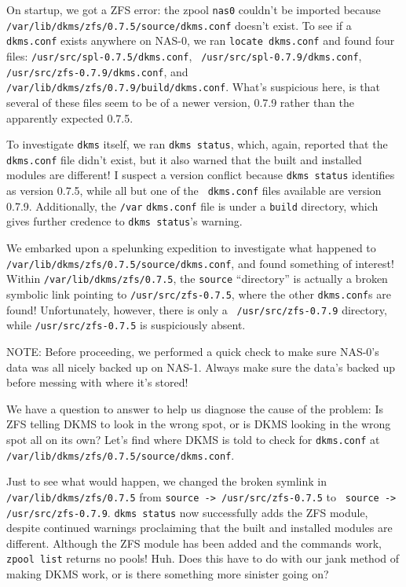 \documentclass[12pt]{article}
\begin{document}
\qq On startup, we got a ZFS error: the zpool {\tt nas0} couldn't be imported
because {\tt /var/lib/dkms/zfs/0.7.5/source/dkms.conf} doesn't exist. To see if
a {\tt dkms.conf} exists anywhere on NAS-0, we ran {\tt locate dkms.conf} and
found four files: {\tt /usr/src/spl-0.7.5/dkms.conf}, {\tt
  /usr/src/spl-0.7.9/dkms.conf}, {\tt /usr/src/zfs-0.7.9/dkms.conf}, and {\tt
  /var/lib/dkms/zfs/0.7.9/build/dkms.conf}. What's suspicious here, is that
several of these files seem to be of a newer version, 0.7.9 rather than the
apparently expected 0.7.5. 

\qq To investigate {\tt dkms} itself, we ran {\tt dkms status}, which, again,
reported that the {\tt dkms.conf} file didn't exist, but it also warned that the
built and installed modules are different! I suspect a version conflict because
{\tt dkms status} identifies as version 0.7.5, while all but one of the {\tt
  dkms.conf} files available are version 0.7.9. Additionally, the {\tt /var}
{\tt dkms.conf} file is under a {\tt build} directory, which gives further
credence to {\tt dkms status}'s warning. 

\qq We embarked upon a spelunking expedition to investigate what happened to
{\tt /var/lib/dkms/zfs/0.7.5/source/dkms.conf}, and found something of interest!
Within {\tt /var/lib/dkms/zfs/0.7.5}, the {\tt source} ``directory'' is actually
a broken symbolic link pointing to {\tt /usr/src/zfs-0.7.5}, where the other
{\tt dkms.conf}s are found! Unfortunately, however, there is only a {\tt
  /usr/src/zfs-0.7.9} directory, while {\tt /usr/src/zfs-0.7.5} is suspiciously
absent. 

\qq NOTE: Before proceeding, we performed a quick check to make sure NAS-0's
data was all nicely backed up on NAS-1. Always make sure the data's backed up
before messing with where it's stored!

\qq We have a question to answer to help us diagnose the cause of the problem:
Is ZFS telling DKMS to look in the wrong spot, or is DKMS looking in the wrong
spot all on its own? Let's find where DKMS is told to check for {\tt dkms.conf}
at {\tt /var/lib/dkms/zfs/0.7.5/source/dkms.conf}. 

\qq Just to see what would happen, we changed the broken symlink in {\tt
  /var/lib/dkms/zfs/0.7.5} from {\tt source -> /usr/src/zfs-0.7.5} to {\tt
  source -> /usr/src/zfs-0.7.9}. {\tt dkms status} now successfully adds the ZFS
module, despite continued warnings proclaiming that the built and installed
modules are different. Although the ZFS module has been added and the commands
work, {\tt zpool list} returns no pools! Huh. Does this have to do with our jank
method of making DKMS work, or is there something more sinister going on? 
\end{document}
